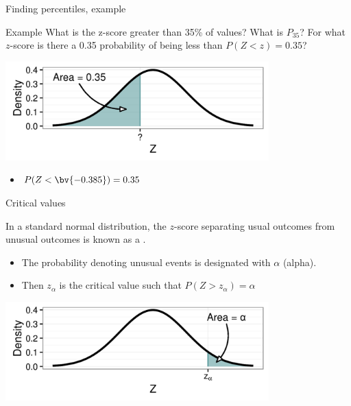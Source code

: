 \documentclass[xcolor=table, aspectratio=169, bigger, handout]{beamer}
\begin{document}
\begin{frame}{Finding percentiles, example}
\begin{exampleblock}{Example}
What is the z-score greater than 35\% of values? What is $P_{35}$? For what $z$-score is there a 0.35 probability of being less than $P(Z < z) = 0.35$?\\
\smallskip
{\centering
\includegraphics[width=4in]{../images/wk06_ex04}
\par}

\begin{itemize}
\pause\item $P(Z < \bv{-0.385}) = 0.35$
\end{itemize}
\end{exampleblock}
\end{frame}

\begin{frame}{Critical values}
\begin{block}{}
In a standard normal distribution, the $z$-score separating usual outcomes from unusual outcomes is known as a .
\begin{itemize}
\item The probability denoting unusual events is designated with $\alpha$ (alpha).
\item Then $z_\alpha$ is the critical value such that $P(Z > z_\alpha) = \alpha$
\end{itemize}
\end{block}

\medskip
{\centering
\includegraphics[width=4in]{../images/wk06_alpha}
\par}

\end{frame}
\end{document}
